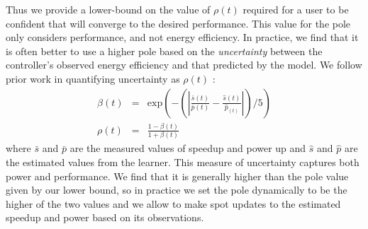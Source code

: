 Thus we provide a lower-bound on the value of $\rho(t)$ required for a
user to be confident that \SYSTEM{} will converge to the desired
performance.  This value for the pole only considers performance, and
not energy efficiency.  In practice, we find that it is often better
to use a higher pole based on the \emph{uncertainty} between the
controller's observed energy efficiency and that predicted by the
model.  We follow prior work in quantifying uncertainty as $\rho(t) $
\cite{Tokic2010}:
\begin{equation}
  \begin{array}{rcl}
    \beta(t) &=&  \text{exp}{\left(- \left( \left|   \frac{\bar{s}(t)}{\bar{p}(t)}  -\frac{ \hat{s}(t)}{\hat{p}_(t)} \right| \right) /5\right)} \\
    \rho(t) &=& \frac{1-\beta(t)}{1+\beta(t)} 
  \end{array}
  \label{eqn:uncer}
\end{equation}
where $\bar{s}$ and $\bar{p}$ are the measured values of speedup and
power up and $\hat{s}$ and $\hat{p}$ are the estimated values from the
learner.  This measure of uncertainty captures both power and
performance.  We find that it is generally higher than the pole value
given by our lower bound, so in practice we set the pole dynamically
to be the higher of the two values and we allow \SYSTEM{} to make spot
updates to the estimated speedup and power based on its observations.
